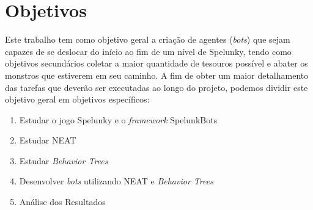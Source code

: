 \chapter{\label{chap:objectives}Objetivos}

Este trabalho tem como objetivo geral a criação de agentes (\textit{bots}) que
sejam capazes de se deslocar do início ao fim de um nível de Spelunky, tendo
como objetivos secundários coletar a maior quantidade de tesouros possível e
abater os monstros que estiverem em seu caminho. A fim de obter um maior
detalhamento das tarefas que deverão ser executadas ao longo do projeto,
podemos dividir este objetivo geral em objetivos específicos:

\begin{enumerate}
    \item
        Estudar o jogo Spelunky e o \textit{framework} SpelunkBots
    \item
        Estudar NEAT
    \item
        Estudar \textit{Behavior Trees}
    \item
        Desenvolver \textit{bots} utilizando NEAT e \textit{Behavior Trees}
    \item
        Análise dos Resultados
\end{enumerate}
